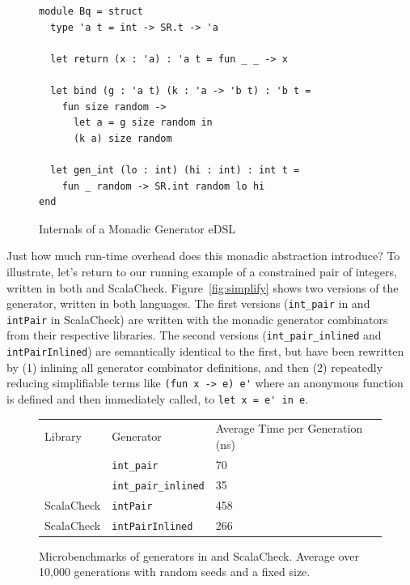 \documentclass[acmsmall]{acmart}
\theoremstyle{definition}
\begin{document}

\begin{figure}
\begin{lstlisting}
module Bq = struct
  type 'a t = int -> SR.t -> 'a

  let return (x : 'a) : 'a t = fun _ _ -> x

  let bind (g : 'a t) (k : 'a -> 'b t) : 'b t =
    fun size random ->
      let a = g size random in
      (k a) size random

  let gen_int (lo : int) (hi : int) : int t =
    fun _ random -> SR.int random lo hi
end
\end{lstlisting}
\caption{Internals of a Monadic Generator eDSL}
\label{fig:bq-internals}
\end{figure}

Just how much run-time overhead does this monadic abstraction introduce? To
illustrate, let's return to our running example of a constrained pair of
integers, written in both \bq{} and ScalaCheck.
Figure~\ref{fig:simplify} shows two versions of the generator, written in both languages.
The first versions (\texttt{int\_pair} in \bq{} and \texttt{intPair} in ScalaCheck) are written with the monadic generator combinators from their respective libraries.
The second versions (\texttt{int\_pair\_inlined} and \texttt{intPairInlined})
are semantically identical to the first, but have been rewritten
by (1) inlining all generator combinator definitions, and then (2)
repeatedly reducing simplifiable terms like \lstinline{(fun x -> e) e'} where an anonymous function is defined and then immediately called, to \lstinline{let x = e' in e}.

\begin{figure}[h]
  \begin{tabular}{lll}
  Library    & Generator          & Average Time per Generation (ns) \\
  \bq{}         & \texttt{int\_pair}          & 70                       \\
  \bq{}         & \texttt{int\_pair\_inlined} & 35                       \\
  ScalaCheck & \texttt{intPair}            & 458                      \\
  ScalaCheck & \texttt{intPairInlined}     & 266
  \end{tabular}
\caption{Microbenchmarks of generators in \bq{} and ScalaCheck. Average over 10,000 generations with random seeds and a fixed size.}
\label{fig:overhead-explanation-perf}
\end{figure}
\end{document}
